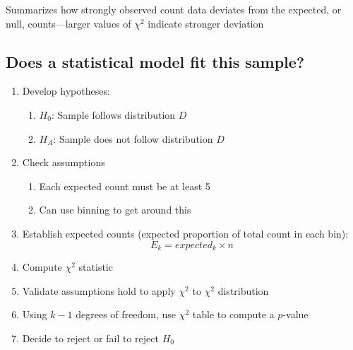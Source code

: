 Summarizes how strongly observed count data deviates from the expected, or null, counts---larger values of $\chi^2$ indicate stronger deviation

\subsection*{Does a statistical model fit this sample?}

\begin{enumerate}
	\item Develop hypotheses:
		\begin{enumerate}
			\item $H_0$: Sample follows distribution $D$
			\item $H_A$: Sample does not follow distribution $D$
		\end{enumerate}
	\item Check assumptions
		\begin{enumerate}
			\item Each expected count must be at least 5
			\item Can use binning to get around this
		\end{enumerate}
	\item Establish expected counts (expected proportion of total count in each bin):
		\begin{equation}
			E_k = expected_k \times n
		\end{equation}
	\item Compute $\chi^2$ statistic
	\item Validate assumptions hold to apply $\chi^2$ to $\chi^2$ distribution
	\item Using $k-1$ degrees of freedom, use $\chi^2$ table to compute a $p$-value
	\item Decide to reject or fail to reject $H_0$
\end{enumerate}

\hformbar



\hformbar



\hformbar


















